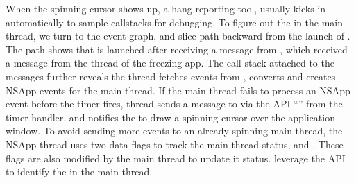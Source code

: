 When the spinning cursor shows up, a hang reporting tool, \spindump usually
kicks in automatically to sample callstacks for debugging. To figure out the
\spinningnode in the main thread, we turn to the event graph, and slice path
backward from the launch of \spindump.
The path shows that \spindump is launched after receiving a message from
, which received a message from the  thread of
the freezing app. The call stack attached to the messages further reveals the
 thread fetches  events from
, converts and creates NSApp events for the main 
thread. If the main thread fails to process an NSApp event before the timer
fires,  thread sends a message to  via the API
``'' from the timer handler, and 
notifies the  to draw a spinning cursor over the application
window. To avoid sending more events to an already-spinning main thread, 
the NSApp thread uses two data flags to track the main thread status, 
 and .
These flags are also modified by the main thread to update it status.
\xxx leverage the API to identify the \spinningnode in the main thread.






